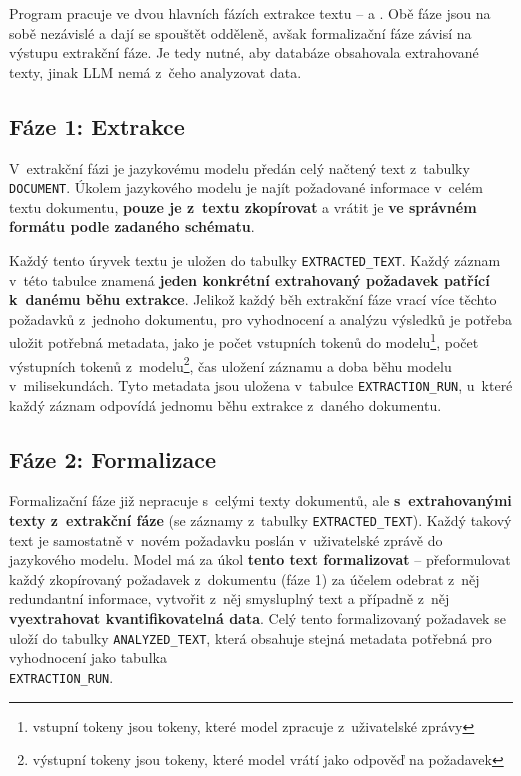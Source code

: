 \documentclass[czech, bc, kiv, he, iso690numb, pdf]{fasthesis}
\begin{document}
Program pracuje ve dvou hlavních fázích extrakce textu --  a . Obě fáze jsou na sobě nezávislé a dají se spouštět odděleně, avšak formalizační fáze závisí na výstupu extrakční fáze. Je tedy nutné, aby databáze obsahovala extrahované texty, jinak LLM nemá z~čeho analyzovat data.

\subsection{Fáze 1: Extrakce}\label{sec:extraction-phase}
V~extrakční fázi je jazykovému modelu předán celý načtený text z~tabulky \verb"DOCUMENT". Úkolem jazykového modelu je najít požadované informace v~celém textu dokumentu, \textbf{pouze je z~textu zkopírovat} a vrátit je \textbf{ve správném formátu podle zadaného schématu}.

Každý tento úryvek textu je uložen do tabulky \verb"EXTRACTED_TEXT". Každý záznam v~této tabulce znamená \textbf{jeden konkrétní extrahovaný požadavek patřící k~danému běhu extrakce}. Jelikož každý běh extrakční fáze vrací více těchto požadavků z~jednoho dokumentu, pro vyhodnocení a analýzu výsledků je potřeba uložit potřebná metadata, jako je počet vstupních tokenů do modelu\footnote{vstupní tokeny jsou tokeny, které model zpracuje z~uživatelské zprávy}, počet výstupních tokenů z~modelu\footnote{výstupní tokeny jsou tokeny, které model vrátí jako odpověď na požadavek}, čas uložení záznamu a doba běhu modelu v~milisekundách. Tyto metadata jsou uložena v~tabulce \verb"EXTRACTION_RUN", u~které každý záznam odpovídá jednomu běhu extrakce z~daného dokumentu.

\subsection{Fáze 2: Formalizace}\label{sec:analysis-phase}
Formalizační fáze již nepracuje s~celými texty dokumentů, ale \textbf{s~extrahovanými texty z~extrakční fáze} (se záznamy z~tabulky \verb"EXTRACTED_TEXT"). Každý takový text je samostatně v~novém požadavku poslán v~uživatelské zprávě do jazykového modelu. Model má za úkol \textbf{tento text formalizovat} -- přeformulovat každý zkopírovaný požadavek z~dokumentu (fáze 1) za účelem odebrat z~něj redundantní informace, vytvořit z~něj smysluplný text a případně z~něj \textbf{vyextrahovat kvantifikovatelná data}. Celý tento formalizovaný požadavek se uloží do tabulky \verb"ANALYZED_TEXT", která obsahuje stejná metadata potřebná pro vyhodnocení jako tabulka \\ \verb"EXTRACTION_RUN".
\end{document}
